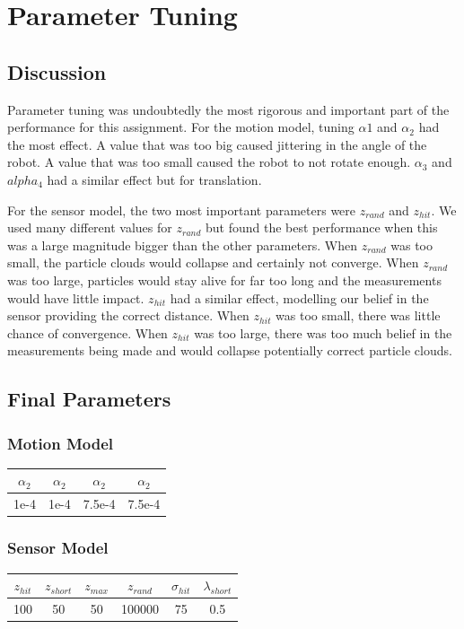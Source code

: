 \documentclass[12pt, a4paper]{article}
\begin{document}
\clearpage
\section{Parameter Tuning}
\subsection{Discussion}
Parameter tuning was undoubtedly the most rigorous and important part of the performance for this assignment. For the motion model, tuning $\alpha1$ and $\alpha_2$ had the most effect. A value that was too big caused jittering in the angle of the robot. A value that was too small caused the robot to not rotate enough. $\alpha_3$ and $alpha_4$ had a similar effect but for translation.

For the sensor model, the two most important parameters were $z_{rand}$ and $z_{hit}$. We used many different values for $z_{rand}$ but found the best performance when this was a large magnitude bigger than the other parameters. When $z_{rand}$ was too small, the particle clouds would collapse and certainly not converge. When $z_{rand}$ was too large, particles would stay alive for far too long and the measurements would have little impact. $z_{hit}$ had a similar effect, modelling our belief in the sensor providing the correct distance. When $z_{hit}$ was too small, there was little chance of convergence. When $z_{hit}$ was too large, there was too much belief in the measurements being made and would collapse potentially correct particle clouds.

\subsection{Final Parameters}
\subsubsection{Motion Model}
\begin{tabular}{||c c c c||} 
  \hline
  $\alpha_2$ & $\alpha_2$ & $\alpha_2$ & $\alpha_2$ \\
  \hline
  1e-4 & 1e-4 & 7.5e-4 & 7.5e-4 \\
  \hline
\end{tabular}

\subsubsection{Sensor Model}
\begin{tabular}{||c c c c c c||} 
  \hline
  $z_{hit}$ & $z_{short}$ & $z_{max}$ & $z_{rand}$ & $\sigma_{hit}$ & $\lambda_{short}$ \\
  \hline
  100 & 50 & 50 & 100000 & 75 & 0.5 \\
  \hline
\end{tabular}
\clearpage
\end{document}
